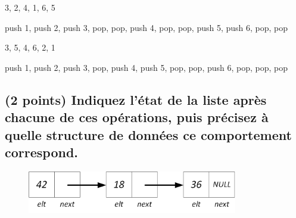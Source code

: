 \documentclass[11pt,a4paper]{article}
\begin{document}
\medskip


\begin{center}

\begin{large}
3, 2, 4, 1, 6, 5
\end{large}

\begin{center}
push 1, push 2, push 3, pop, pop, push 4, pop, pop, push 5, push 6, pop, pop
\end{center}


\begin{large}
3, 5, 4, 6, 2, 1
\end{large}

\begin{center}
push 1, push 2, push 3, pop, push 4, push 5, pop, pop, push 6, pop, pop, pop
\end{center}

\end{center}

\vfillLast

\newpage

\subsection{(2 points) Indiquez l'état de la liste après chacune de ces opérations, puis précisez à quelle structure de données ce comportement correspond. }


\begin{figure}[ht!]
\centering
\centerline{  %
\includegraphics[height=1.85cm]{img/Liste_p_1.png}
}
\end{figure}
\end{document}
